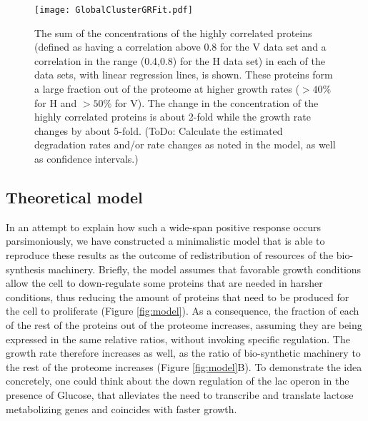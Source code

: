 \documentclass[notitlepage]{article}
\begin{document}
\begin{figure}[h]
\centering
\texttt{[image: GlobalClusterGRFit.pdf]}
\caption{
The sum of the concentrations of the highly correlated proteins (defined as having a correlation above 0.8 for the V data set and a correlation in the range (0.4,0.8) for the H data set) in each of the data sets, with linear regression lines, is shown.
These proteins form a large fraction out of the proteome at higher growth rates ($>40\%$ for H and $>50\%$ for V).
The change in the concentration of the highly correlated proteins is about 2-fold while the growth rate changes by about 5-fold.
(ToDo: Calculate the estimated degradation rates and/or rate changes as noted in the model, as well as confidence intervals.)
}
\label{fig:globalgrcorr}
\end{figure}


\subsection{Theoretical model}
In an attempt to explain how such a wide-span positive response occurs parsimoniously, we have constructed a minimalistic model that is able to reproduce these results as the outcome of redistribution of resources of the bio-synthesis machinery.
Briefly, the model assumes that favorable growth conditions allow the cell to down-regulate some proteins that are needed in harsher conditions, thus reducing the amount of proteins that need to be produced for the cell to proliferate (Figure \ref{fig:model}).
As a consequence, the fraction of each of the rest of the proteins out of the proteome increases, assuming they are being expressed in the same relative ratios, without invoking specific regulation.
The growth rate therefore increases as well, as the ratio of bio-synthetic machinery to the rest of the proteome increases (Figure \ref{fig:model}B).
To demonstrate the idea concretely, one could think about the down regulation of the lac operon in the presence of Glucose, that alleviates the need to transcribe and translate lactose metabolizing genes and coincides with faster growth.
\end{document}
